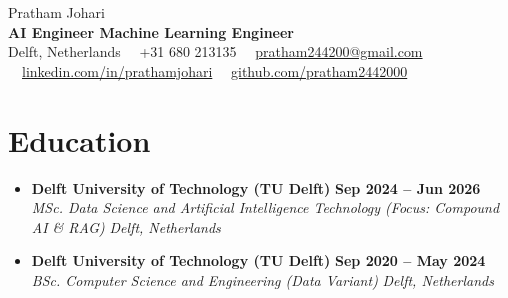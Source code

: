 \documentclass[letterpaper,11pt]{article}
\newcommand{\resumeSubheading}[4]{
  \vspace{-2pt}\item
    \textbf{\large#1} \hfill \textbf{\normalsize#2}\\
    \textit{\normalsize#3} \hfill \textit{\small#4}
  \vspace{-7pt}
}
\newcommand{\resumeSubHeadingListStart}{\begin{itemize}[leftmargin=0.0in, label={}, topsep=0pt, itemsep=5pt]}
\newcommand{\resumeSubHeadingListEnd}{\end{itemize}}
\begin{document}
\newcommand{\targetRole}{AI Engineer \textbar{} Machine Learning Engineer}

\begin{center}
  \vspace{-10pt}
  {\huge{Pratham Johari}} \\[2pt]
  {\textbf{\color{airforceblue}\targetRole}} \\[3pt]
  \footnotesize{
    Delft, Netherlands \ \textbullet \
    +31 680 213135 \ \textbullet \
    \href{mailto:pratham244200@gmail.com}{\color{linkblue}pratham244200@gmail.com} \ \textbullet \
    \href{https://linkedin.com/in/prathamjohari}{\color{linkblue}linkedin.com/in/prathamjohari} \ \textbullet \
    \href{https://github.com/pratham2442000}{\color{linkblue}github.com/pratham2442000}
  }
  \vspace{-8pt}
\end{center}


\section{Education}
\resumeSubHeadingListStart
\resumeSubheading
{Delft University of Technology (TU Delft)}{Sep 2024 -- Jun 2026}
{MSc. Data Science and Artificial Intelligence Technology (Focus: Compound AI \& RAG)}{Delft, Netherlands}
\resumeSubheading
{Delft University of Technology (TU Delft)}{Sep 2020 -- May 2024}
{BSc. Computer Science and Engineering (Data Variant)}{Delft, Netherlands}
\resumeSubHeadingListEnd
\vspace{-8pt}

\end{document}
